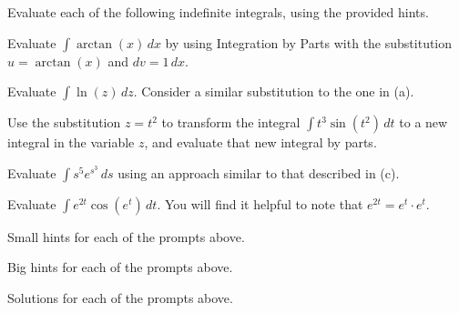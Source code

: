 \begin{activity} \label{A:5.1.2}  Evaluate each of the following indefinite integrals, using the provided hints.

\ba
	\item Evaluate $\int \arctan(x) \, dx$ by using Integration by Parts with the substitution $u = \arctan(x)$ and $dv = 1 \, dx$.
	\item Evaluate $\int \ln(z) \,dz$.  Consider a similar substitution to the one in (a).
	\item Use the substitution $z = t^2$ to transform the integral $\int t^3 \sin(t^2) \, dt$ to a new integral in the variable $z$, and evaluate that new integral by parts.
	\item Evaluate $\int s^5 e^{s^3} \, ds$ using an approach similar to that described in (c).
	\item Evaluate $\int e^{2t} \cos(e^t) \, dt$.  You will find it helpful to note that $e^{2t} = e^t \cdot e^t.$
\ea
\end{activity}
\begin{smallhint}
\ba
	\item Small hints for each of the prompts above.
\ea
\end{smallhint}
\begin{bighint}
\ba
	\item Big hints for each of the prompts above.
\ea
\end{bighint}
\begin{activitySolution}
\ba
	\item Solutions for each of the prompts above.
\ea
\end{activitySolution}
\aftera